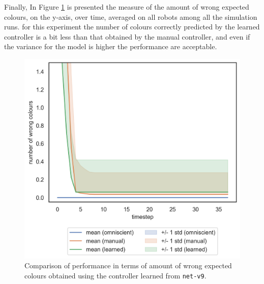 Finally, In Figure \ref{fig:net-v9error} is presented the measure of the amount of 
wrong expected colours, on the y-axis, over time, averaged on all robots among 
all the simulation runs. 
for this experiment the number of colours correctly predicted by the learned 
controller is a bit less than that obtained by the manual controller, and even if the 
variance for the model is higher the performance are acceptable.
\begin{figure}[!htb]
	\centering
	\includegraphics[width=.5\textwidth]{contents/images/net-v9/colours-errors-compressed}%
	\caption[Evaluation of \texttt{net-v9} amount of wrong expected 
	colours.]{Comparison of performance in terms of amount of wrong expected 
		colours obtained using the controller learned from \texttt{net-v9}.}
	\label{fig:net-v9error}
\end{figure}


